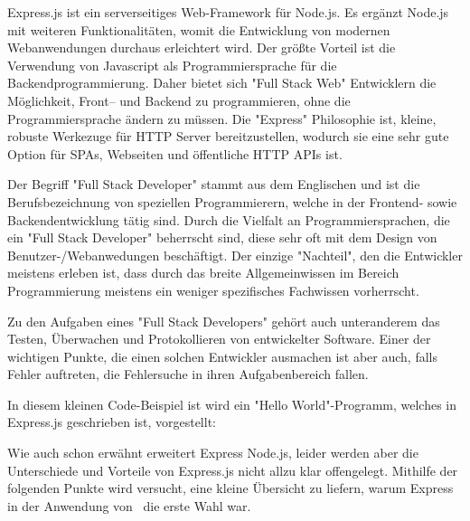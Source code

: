  \label{sec:express}

Express.js ist ein serverseitiges Web-Framework für Node.js. Es ergänzt Node.js mit weiteren Funktionalitäten, womit die Entwicklung von modernen Webanwendungen durchaus erleichtert wird. Der größte Vorteil ist die Verwendung von Javascript als Programmiersprache für die Backendprogrammierung. Daher bietet sich "Full Stack Web" Entwicklern die Möglichkeit, Front– und Backend zu programmieren, ohne die Programmiersprache ändern zu müssen. Die "Express" Philosophie ist, kleine, robuste Werkezuge für HTTP Server bereitzustellen, wodurch sie eine sehr gute Option für SPAs, Webseiten und öffentliche HTTP APIs ist. \cite{Express}

Der Begriff "Full Stack Developer" stammt aus dem Englischen und ist die Berufsbezeichnung von speziellen Programmierern, welche in der Frontend- sowie Backendentwicklung tätig sind. Durch die Vielfalt an Programmiersprachen, die ein "Full Stack Developer" beherrscht sind, diese sehr oft mit dem Design von Benutzer-/Webanwedungen beschäftigt. Der einzige "Nachteil", den die Entwickler meistens erleben ist, dass durch das breite Allgemeinwissen im Bereich Programmierung meistens ein weniger spezifisches Fachwissen vorherrscht. 

Zu den Aufgaben eines "Full Stack Developers" gehört auch unteranderem das Testen, Überwachen und Protokollieren von entwickelter Software. Einer der wichtigen Punkte, die einen solchen Entwickler ausmachen ist aber auch, falls Fehler auftreten, die Fehlersuche in ihren Aufgabenbereich fallen. \cite{FullStack}

\pagebreak
{}

In diesem kleinen Code-Beispiel ist wird ein "Hello World"-Programm, welches in Express.js geschrieben ist, vorgestellt:


\cite{Express}


Wie auch schon erwähnt erweitert Express Node.js, leider werden aber die Unterschiede und Vorteile von Express.js nicht allzu klar offengelegt. Mithilfe der folgenden Punkte wird versucht, eine kleine Übersicht zu liefern, warum Express in der Anwendung von \ZELIA\ die erste Wahl war.

